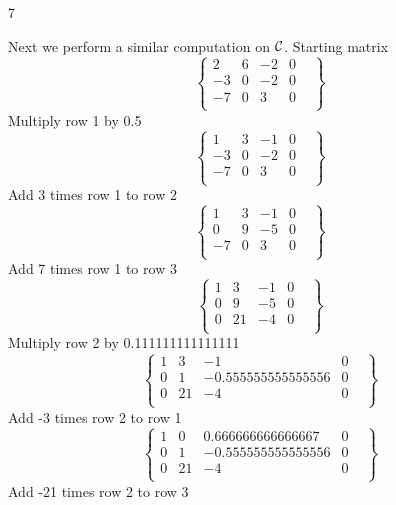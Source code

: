 \documentclass{exercises}
\begin{document}
\begin{exr}{}{7}
\begin{enumerate}
Next we perform a similar computation on $\scriptc$.
Starting matrix
\begin{equation}
\left\{
    \begin{array}{ccc|cl}2&6&-2&0&\\-3&0&-2&0&\\-7&0&3&0&\\\end{array}
\right\}
\end{equation}Multiply row 1 by 0.5
\begin{equation}
\left\{
    \begin{array}{ccc|cl}1&3&-1&0&\\-3&0&-2&0&\\-7&0&3&0&\\\end{array}
\right\}
\end{equation}Add 3 times row 1 to row 2
\begin{equation}
\left\{
    \begin{array}{ccc|cl}1&3&-1&0&\\0&9&-5&0&\\-7&0&3&0&\\\end{array}
\right\}
\end{equation}Add 7 times row 1 to row 3
\begin{equation}
\left\{
    \begin{array}{ccc|cl}1&3&-1&0&\\0&9&-5&0&\\0&21&-4&0&\\\end{array}
\right\}
\end{equation}Multiply row 2 by 0.111111111111111
\begin{equation}
\left\{
    \begin{array}{ccc|cl}1&3&-1&0&\\0&1&-0.555555555555556&0&\\0&21&-4&0&\\\end{array}
\right\}
\end{equation}Add -3 times row 2 to row 1
\begin{equation}
\left\{
    \begin{array}{ccc|cl}1&0&0.666666666666667&0&\\0&1&-0.555555555555556&0&\\0&21&-4&0&\\\end{array}
\right\}
\end{equation}Add -21 times row 2 to row 3

\end{enumerate}
\end{exr}
\end{document}
